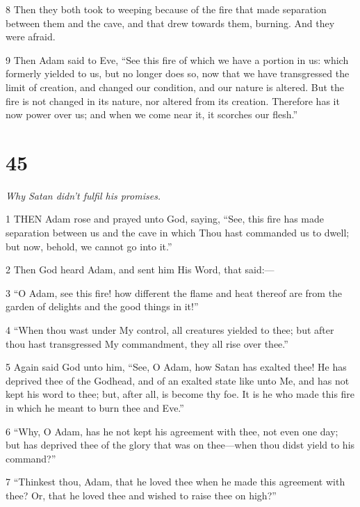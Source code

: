 \par 8 Then they both took to weeping because of the fire that made separation between them and the cave, and that drew towards them, burning. And they were afraid.

\par 9 Then Adam said to Eve, “See this fire of which we have a portion in us: which formerly yielded to us, but no longer does so, now that we have transgressed the limit of creation, and changed our condition, and our nature is altered. But the fire is not changed in its nature, nor altered from its creation. Therefore has it now power over us; and when we come near it, it scorches our flesh.”

\chapter{45}

\par \textit{Why Satan didn't fulfil his promises.}

\par 1 THEN Adam rose and prayed unto God, saying, “See, this fire has made separation between us and the cave in which Thou hast commanded us to dwell; but now, behold, we cannot go into it.”

\par 2 Then God heard Adam, and sent him His Word, that said:—

\par 3 “O Adam, see this fire! how different the flame and heat thereof are from the garden of delights and the good things in it!”

\par 4 “When thou wast under My control, all creatures yielded to thee; but after thou hast transgressed My commandment, they all rise over thee.”

\par 5 Again said God unto him, “See, O Adam, how Satan has exalted thee! He has deprived thee of the Godhead, and of an exalted state like unto Me, and has not kept his word to thee; but, after all, is become thy foe. It is he who made this fire in which he meant to burn thee and Eve.”

\par 6 “Why, O Adam, has he not kept his agreement with thee, not even one day; but has deprived thee of the glory that was on thee—when thou didst yield to his command?”

\par 7 “Thinkest thou, Adam, that he loved thee when he made this agreement with thee? Or, that he loved thee and wished to raise thee on high?”


